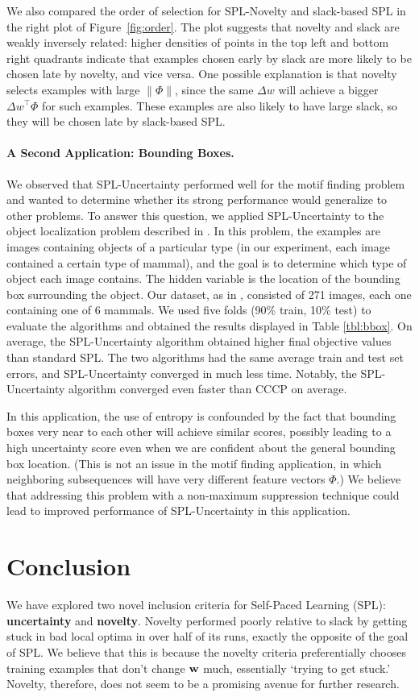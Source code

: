 \documentclass{article}
\newcommand{\mysection}[1]{\vspace{-4mm}\section{#1}\vspace{-4mm}}
\newcommand{\myparagraph}[1]{\vspace{-2mm}\paragraph{#1}}
\begin{document}
We also compared the order of selection for SPL-Novelty and slack-based SPL in the right plot of Figure~\ref{fig:order}. The plot suggests that novelty and slack are weakly inversely related: higher densities of points in the top left and bottom right quadrants indicate that examples chosen early by slack are more likely to be chosen late by novelty, and vice versa.  One possible explanation is that novelty selects examples with large $\|\Phi\|$, since the same $\Delta w$ will achieve a bigger $\Delta w^\top\Phi$ for such examples.  These examples are also likely to have large slack, so they will be chosen late by slack-based SPL.

\myparagraph{A Second Application: Bounding Boxes.} We observed that SPL-Uncertainty performed well for the motif finding problem and wanted to determine whether its strong performance would generalize to other problems. To answer this question, we applied SPL-Uncertainty to the object localization problem described in \cite{SPL}. In this problem, the examples are images containing objects of a particular type (in our experiment, each image contained a certain type of mammal), and the goal is to determine which type of object each image contains. The hidden variable is the location of the bounding box surrounding the object. Our dataset, as in \cite{SPL}, consisted of 271 images, each one containing one of 6 mammals. We used five folds (90\% train, 10\% test) to evaluate the algorithms and obtained the results displayed in Table \ref{tbl:bbox}. On average, the SPL-Uncertainty algorithm obtained higher final objective values than standard SPL. The two algorithms had the same average train and test set errors, and SPL-Uncertainty converged in much less time. Notably, the SPL-Uncertainty algorithm converged even faster than CCCP on average.

In this application, the use of entropy is confounded by the fact that bounding boxes very near to each other will achieve similar scores, possibly leading to a high uncertainty score even when we are confident about the general bounding box location. (This is not an issue in the motif finding application, in which neighboring subsequences will have very different feature vectors $\Phi$.)  We believe that addressing this problem with a non-maximum suppression technique could lead to improved performance of SPL-Uncertainty in this application. 

\mysection{Conclusion}
\label{sec:conclusion}

We have explored two novel inclusion criteria for Self-Paced Learning ({\sc SPL}): \textbf{uncertainty} and \textbf{novelty}. Novelty performed poorly relative to slack by getting stuck in bad local optima in over half of its runs, exactly the opposite of the goal of SPL. We believe that this is because the novelty criteria preferentially chooses training examples that don't change $\bf w$ much, essentially `trying to get stuck.' Novelty, therefore, does not seem to be a promising avenue for further research.
\end{document}
